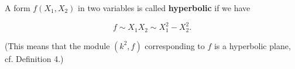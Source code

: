 A form $f(X_1, X_2)$ in two variables is called \textbf{hyperbolic} if we have

$$f \sim X_1 X_2 \sim X_1^2 - X_2^2.$$

(This means that the module $(k^2, f)$ corresponding to $f$ is a hyperbolic plane, cf. Definition 4.)
